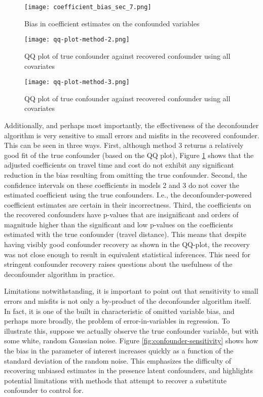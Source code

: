 \begin{figure}
   \centering
   \texttt{[image: coefficient\_bias\_sec\_7.png]}
   \caption{Bias in coefficient estimates on the confounded variables}
   \label{fig:bias-plot}
\end{figure}


\begin{figure}
   \centering
   \texttt{[image: qq-plot-method-2.png]}
   \caption{QQ plot of true confounder against recovered confounder using all covariates}
   \label{fig:qq-plot-method-2}
\end{figure}

\begin{figure}
   \centering
   \texttt{[image: qq-plot-method-3.png]}
   \caption{QQ plot of true confounder against recovered confounder using all covariates}
   \label{fig:qq-plot-method-3}
\end{figure}


Additionally, and perhaps most importantly, the effectiveness of the
deconfounder algorithm is very sensitive to small errors and misfits in the
recovered confounder.
This can be seen in three ways.
First, although method 3 returns a relatively good fit of the
true confounder (based on the QQ plot), Figure \ref{fig:bias-plot} shows that the adjusted coefficients on travel
time and cost do not exhibit any significant reduction in the bias resulting from
omitting the true confounder.
Second, the confidence intervals on these coefficients in models 2 and 3 do not cover the estimated coefficient using the true confounders.
I.e., the deconfounder-powered coefficient estimates are certain in their incorrectness.
Third, the coefficients on the recovered confounders have p-values that are insignificant and orders of magnitude higher than the significant and low p-values on the coefficients estimated with the true confounder (travel distance).
This means that despite having visibly good confounder recovery as shown in the QQ-plot, the recovery was not close enough to result in equivalent statistical inferences.
This need for stringent confounder recovery raises questions about the usefulness of the deconfounder algorithm in practice.

Limitations notwithstanding, it is
important to point out that sensitivity to small errors and misfits is not only a by-product of the deconfounder
algorithm itself. In fact, it is one of the built in characteristic of omitted
variable bias, and perhaps more broadly, the problem of error-in-variables in
regression. To illustrate this, suppose we actually observe the true
confounder variable, but with some white, random Gaussian noise. Figure \ref{fig:confounder-sensitivity}
shows how the bias in the parameter of interest increases quickly as a
function of the standard deviation of the random noise. This emphasizes the
difficulty of recovering unbiased estimates in the presence latent confounders,
and highlights potential limitations with methods that attempt to recover a
substitute confounder to control for.

